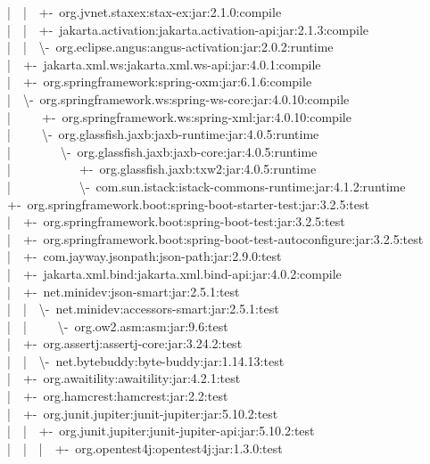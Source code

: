 |~~|~~+-~org.jvnet.staxex:stax-ex:jar:2.1.0:compile\\
|~~|~~+-~jakarta.activation:jakarta.activation-api:jar:2.1.3:compile\\
|~~|~~\textbackslash-~org.eclipse.angus:angus-activation:jar:2.0.2:runtime\\
|~~+-~jakarta.xml.ws:jakarta.xml.ws-api:jar:4.0.1:compile\\
|~~+-~org.springframework:spring-oxm:jar:6.1.6:compile\\
|~~\textbackslash-~org.springframework.ws:spring-ws-core:jar:4.0.10:compile\\
|~~~~~+-~org.springframework.ws:spring-xml:jar:4.0.10:compile\\
|~~~~~\textbackslash-~org.glassfish.jaxb:jaxb-runtime:jar:4.0.5:runtime\\
|~~~~~~~~\textbackslash-~org.glassfish.jaxb:jaxb-core:jar:4.0.5:runtime\\
|~~~~~~~~~~~+-~org.glassfish.jaxb:txw2:jar:4.0.5:runtime\\
|~~~~~~~~~~~\textbackslash-~com.sun.istack:istack-commons-runtime:jar:4.1.2:runtime\\
+-~org.springframework.boot:spring-boot-starter-test:jar:3.2.5:test\\
|~~+-~org.springframework.boot:spring-boot-test:jar:3.2.5:test\\
|~~+-~org.springframework.boot:spring-boot-test-autoconfigure:jar:3.2.5:test\\
|~~+-~com.jayway.jsonpath:json-path:jar:2.9.0:test\\
|~~+-~jakarta.xml.bind:jakarta.xml.bind-api:jar:4.0.2:compile\\
|~~+-~net.minidev:json-smart:jar:2.5.1:test\\
|~~|~~\textbackslash-~net.minidev:accessors-smart:jar:2.5.1:test\\
|~~|~~~~~\textbackslash-~org.ow2.asm:asm:jar:9.6:test\\
|~~+-~org.assertj:assertj-core:jar:3.24.2:test\\
|~~|~~\textbackslash-~net.bytebuddy:byte-buddy:jar:1.14.13:test\\
|~~+-~org.awaitility:awaitility:jar:4.2.1:test\\
|~~+-~org.hamcrest:hamcrest:jar:2.2:test\\
|~~+-~org.junit.jupiter:junit-jupiter:jar:5.10.2:test\\
|~~|~~+-~org.junit.jupiter:junit-jupiter-api:jar:5.10.2:test\\
|~~|~~|~~+-~org.opentest4j:opentest4j:jar:1.3.0:test\\
